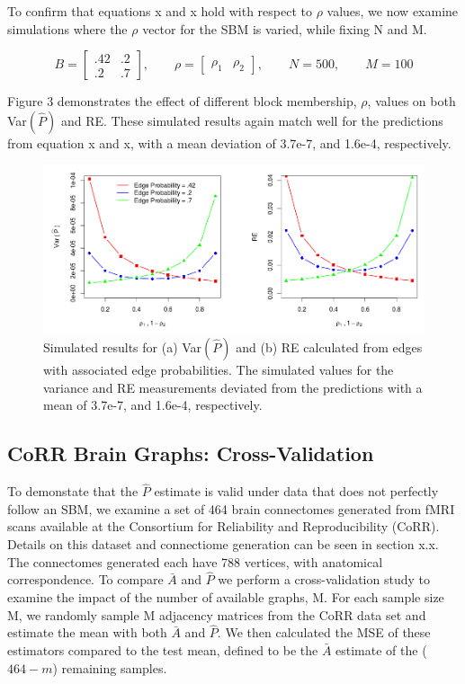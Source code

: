 To confirm that equations x and x hold with respect to $\rho$ values, we now examine simulations where the $\rho$ vector for the SBM  is varied, while fixing N and M.

\begin{equation*}
B = \begin{bmatrix}
.42 & .2 \\
.2 & .7 
\end{bmatrix}
,\qquad \rho = \begin{bmatrix}
\rho_1 & \rho_2
\end{bmatrix}
,\qquad N = 500,\qquad M = 100
\end{equation*}

Figure 3 demonstrates the effect of different block membership, $\rho$, values on both Var$(\hat{P})$ and RE.  These simulated results again match well for the predictions from equation x and x, with a mean deviation of 3.7e-7, and 1.6e-4, respectively.
\begin{figure}[!htb]
	\centering
	\includegraphics[width=16cm]{VarRE.PNG}
	\caption{Simulated results for (a) Var$(\hat{P})$ and (b) RE calculated from edges with associated edge probabilities. The simulated values for the variance and RE measurements deviated from the predictions with a mean of 3.7e-7, and 1.6e-4, respectively.}
	\label{fig:plot1}
\end{figure}
\subsection{CoRR Brain Graphs: Cross-Validation}
	
	To demonstate that the $\hat{P}$ estimate is valid under data that does not perfectly follow an SBM, we examine a set of 464 brain connectomes generated from fMRI scans available at the Consortium for Reliability and Reproducibility (CoRR).  Details on this dataset and connectiome generation can be seen in section x.x.  The connectomes generated each have 788 vertices, with anatomical correspondence. To compare $\bar{A}$ and $\hat{P}$ we perform a cross-validation study to examine the impact of the number of available graphs, M.  For each sample size M, we randomly sample M adjacency matrices from the CoRR data set and estimate the mean with both $\bar{A}$ and $\hat{P}$.  We then calculated the MSE of these estimators compared to the test mean, defined to be the $\bar{A}$ estimate of the ($464-m$) remaining samples.
	
